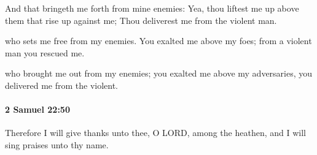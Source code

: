 			\begin{versebox}
					\item[BHS] 
					\item[ASV] And that bringeth me forth from mine enemies: Yea, thou liftest me up above them that rise up against me; Thou deliverest me from the violent man.
					\item[NIV] who sets me free from my enemies. You exalted me above my foes; from a violent man you rescued me.
					\item[NRSV] who brought me out from my enemies; you exalted me above my adversaries, you delivered me from the violent.
			\end{versebox}

		\paragraph{2 Samuel 22:50} %
			\label{2SAMUEL-22-50}

			Therefore I will give thanks unto thee, O LORD, among the heathen, and I will sing praises unto thy name.

